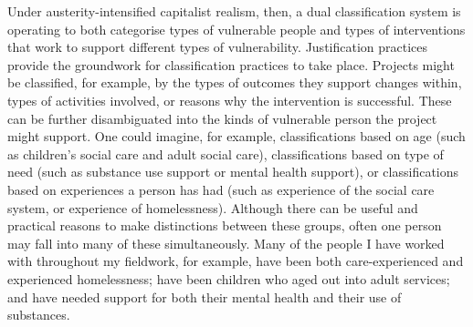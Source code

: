 Under austerity-intensified capitalist realism, then, a dual classification system is operating to both categorise types of vulnerable people and types of interventions that work to support different types of vulnerability. Justification practices provide the groundwork for classification practices to take place. Projects might be classified, for example, by the types of outcomes they support changes within, types of activities involved, or reasons why the intervention is successful. These can be further disambiguated into the kinds of vulnerable person the project might support. One could imagine, for example, classifications based on age (such as children's social care and adult social care), classifications based on type of need (such as substance use support or mental health support), or classifications based on experiences a person has had (such as experience of the social care system, or experience of homelessness). Although there can  be useful and practical reasons to make distinctions between these groups, often one person may fall into many of these simultaneously. Many of the people I have worked with throughout my fieldwork, for example, have been both care-experienced and experienced homelessness; have been children who aged out into adult services; and have needed support for both their mental health and their use of substances. 

